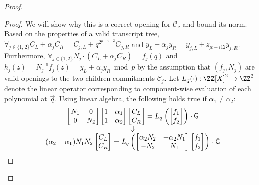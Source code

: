 \begin{proof}
\begin{proof}
We will show why this is a correct opening for $\mathcal{C}_\nu$ and bound its norm. Based on the properties of a valid transcript tree, $\forall_{j \in \{1,2\}} C_L + \alpha_j C_R =  C_{j,L} + q^{2^{\mu - i - 2}} C_{j,R}$ and $y_L + \alpha_j y_R = y_{j,L} + z_{{\mu - i 12}} y_{j, R}$. Furthermore, $\forall_{j \in \{1,2\}} N_j \cdot (C_L + \alpha_j C_R ) = f_j(q)$ and $h_j(z) = N_j^{-1} f_j(z) = y_L + \alpha_j y_R \bmod p$ by the assumption that $(f_j, N_j)$ are valid openings to the two children commitments $\mathcal{C}_j$.  Let $L_q(\cdot): \ZZ[X]^2 \rightarrow \ZZ^2$ denote the linear operator corresponding to component-wise evaluation of each polynomial at $\vec{q}$. Using linear algebra, the following holds true if $\alpha_1 \neq \alpha_2$:
\begin{equation*}
\begin{array}{c}
\begin{bmatrix}
N_1 & 0 \\
0 & N_2 \\
\end{bmatrix} 
\begin{bmatrix}
1 & \alpha_1 \\
1 & \alpha_2 \\
\end{bmatrix} 
\begin{bmatrix}
C_L \\
C_R \\
\end{bmatrix} 
= 
L_q \left(
\begin{bmatrix}
f_1 \\
f_2\\
\end{bmatrix} 
\right)
 \cdot \gr{G} \\
\Downarrow\\
(\alpha_2 - \alpha_1) N_1 N_2 
\begin{bmatrix}
C_L \\
C_R \\
\end{bmatrix}
= 
L_q\left(
\begin{bmatrix}
\alpha_2 N_2 & -\alpha_2 N_1 \\
-N_2 & N_1 \\
\end{bmatrix}
\begin{bmatrix}
f_1 \\
f_2 \\
\end{bmatrix}
\right)
\cdot  \gr{G}

\end{array}
\end{equation*}
\end{proof}
\end{proof}
